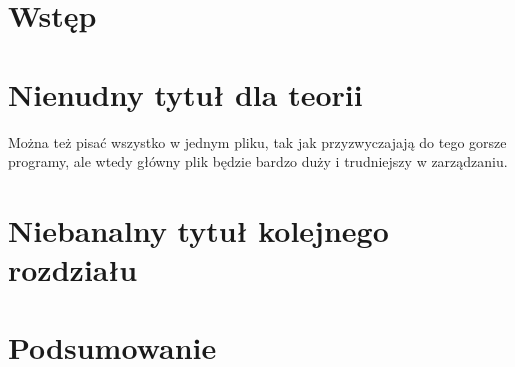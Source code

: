 \chapter{Wstęp}


\chapter{Nienudny tytuł dla teorii}
Można też pisać wszystko w jednym pliku, tak jak przyzwyczajają do tego gorsze programy, ale wtedy główny plik będzie bardzo duży i trudniejszy w zarządzaniu.
%
%

\chapter{Niebanalny tytuł kolejnego rozdziału}


\chapter{Podsumowanie}

